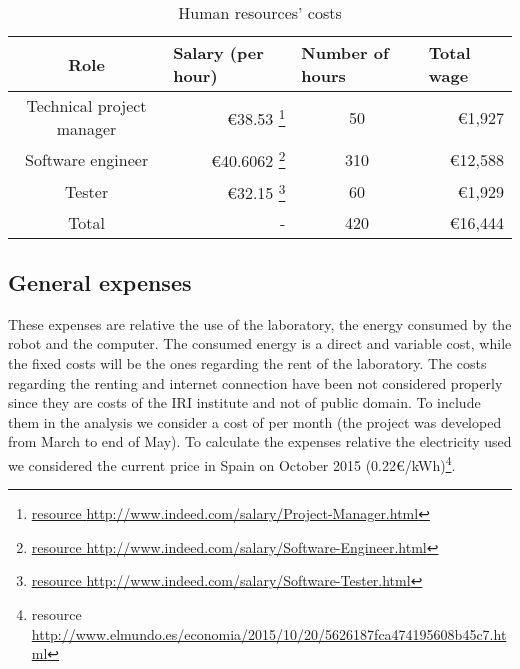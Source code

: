 \begin{savenotes}%
\begin{table}[ht]
  \centering
  \begin{tabular}{|c|r|c|r|}
    \hline
    \textbf{Role}      & \multicolumn{1}{l|}{\textbf{Salary (per hour)}} & \multicolumn{1}{l|}{\textbf{Number of hours}} & \multicolumn{1}{l|}{\textbf{Total wage}} \\ \hline\hline
    Technical project manager  & €38.53 \footnote{\href{http://www.indeed.com/salary/Project-Manager.html}{resource \url{http://www.indeed.com/salary/Project-Manager.html}}}  & 50                                           & €1,927   \\ \hline
    Software engineer & €40.6062                                         \footnote{\href{http://www.indeed.com/salary/Software-Engineer.html}{resource \url{http://www.indeed.com/salary/Software-Engineer.html}}}   & 310 & €12,588
    \\ \hline
    
    Tester             & €32.15 \footnote{\href{http://www.indeed.com/salary/Software-Tester.html}{resource \url{http://www.indeed.com/salary/Software-Tester.html}}}   & 60                                           & €1,929 \\ \hline\hline
    Total              & -                                               & 420                                         & €16,444                               \\ \hline
  \end{tabular}

  \caption{Human resources' costs}
  \label{tab:humanResources}
\end{table}
\end{savenotes}

\subsection*{General expenses}
These expenses are relative the use of the laboratory, the energy consumed by the robot and the computer. The consumed energy is a direct and variable cost, while the fixed costs will be the ones regarding the rent of the laboratory. The costs regarding the renting and internet connection have been not considered properly since they are costs of the IRI institute and not of public domain. To include them in the analysis we consider a cost of  per month (the project was developed from March to end of May). To calculate the expenses relative the electricity used we considered the current price in Spain on October 2015 (0.22€/kWh)\footnote{resource \href{http://www.elmundo.es/economia/2015/10/20/5626187fca474195608b45c7.html}{\url{http://www.elmundo.es/economia/2015/10/20/5626187fca474195608b45c7.html}}}.

